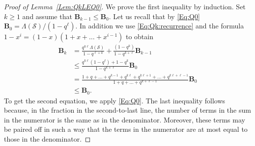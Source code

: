 \documentclass[letterpaper,11pt]{article}
\theoremstyle{definition}
\theoremstyle{remark}
\renewcommand{\le}{\leqslant}
\renewcommand{\ge}{\geqslant}
\newcommand{\productO}{\Lambda(\cS)}
\newcommand{\bB}{\mathbf{B}}
\newcommand{\cS}{\mathcal{S}}
\begin{document}
\begin{proof}[Proof of Lemma~\ref{Lem:QkLEQ0}]
	We prove the first inequality by induction. Set $k\ge 1$ and assume that $\bB_{k-1}\le \bB_{0}$. Let us recall that by \eqref{Eq:Q0} $\bB_{0}=\productO/(1-q^{\ell})$. In addition we use \eqref{Eq:Qk:recurrence} and the formula $1-x^i=(1-x)(1+x+\ldots+x^{i-1})$ to obtain 
	\begin{equation*}
		\begin{split}
			\bB_{k}
			&=\frac{q^{k\ell}\productO}{1-q^{\ell+k}}+\frac{(1-q^k)}{1-q^{k+\ell}}\bB_{k-1}\\
			&\le \frac{q^{k\ell}(1-q^{\ell})+1-q^k}{1-q^{k+\ell}}\bB_{0}\\
			&=\frac{1+q+\ldots+q^{k-1}+q^{k\ell}+q^{k\ell+1}+\ldots+q^{k\ell+\ell-1}}{1+q+\ldots+q^{k+\ell-1}}\bB_{0}\\
			&\le \bB_{0}.
		\end{split}
	\end{equation*} 
	To get the second equation, we apply \eqref{Eq:Q0}. The last inequality follows because, in the fraction in the second-to-last line, the number of terms in the sum in the numerator is the same as in the denominator. Moreover, these terms may be paired off in such a way that the terms in the numerator are at most equal to those in the denominator. 
	

\end{proof}
\end{document}
